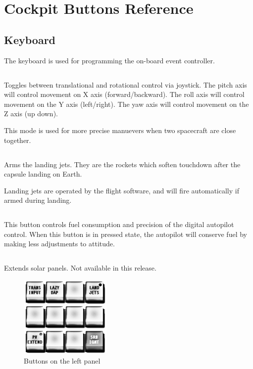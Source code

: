 \twocolumn
\section{Cockpit Buttons Reference}
\subsection{Keyboard}
The keyboard is used for programming the on-board event controller.

\subsection{}
Toggles between translational and rotational control via joystick. The pitch axis will control movement on X axis (forward/backward). The roll axis will control movement on the Y axis (left/right). The yaw axis will control movement on the Z axis (up down).

This mode is used for more precise manuevers when two spacecraft are close together.

\subsection{}
Arms the landing jets. They are the rockets which soften touchdown after the capsule landing on Earth.

Landing jets are operated by the flight software, and will fire automatically if armed during landing.

\subsection{}
This button controls fuel consumption and precision of the digital autopilot control. When this button is in pressed state, the autopilot will conserve fuel by making less adjustments to attitude.

\subsection{}
Extends solar panels. Not available in this release.

\begin{figure}[htb]
\centering
\includegraphics[bb=0 0 5.9cm 5.3cm,scale=0.75]{../graphics/rv550_buttons1.png}
\caption{Buttons on the left panel}
\end{figure}

